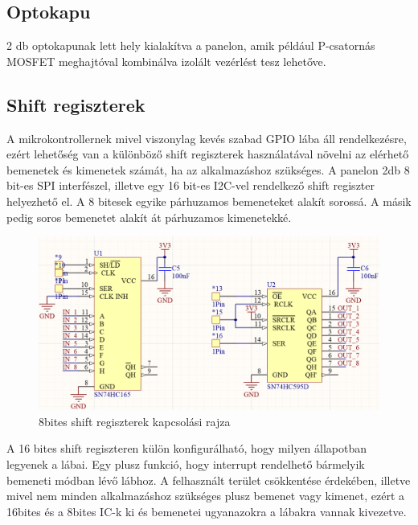 \subsection{Optokapu}
2 db optokapunak lett hely kialakítva a panelon, amik például P-csatornás MOSFET meghajtóval kombinálva izolált vezérlést tesz lehetőve.


\subsection{Shift regiszterek}
A mikrokontrollernek mivel viszonylag kevés szabad GPIO lába áll rendelkezésre, ezért lehetőség van a különböző shift regiszterek használatával növelni az elérhető bemenetek és kimenetek számát, ha az alkalmazáshoz szükséges. A panelon 2db 8 bit-es SPI interfészel, illetve egy 16 bit-es I2C-vel rendelkező shift regiszter helyezhető el. A 8 bitesek egyike párhuzamos bemeneteket alakít sorossá. A másik pedig soros bemenetet alakít át párhuzamos kimenetekké. 
\begin{figure}[!h]
    \centering
    \includegraphics[width=150mm, keepaspectratio]{figures/8bit_shift_registers.png}
    \caption{8bites shift regiszterek kapcsolási rajza}
    \label{fig:TeXstudio}
\end{figure}
A 16 bites shift regiszteren külön konfigurálható, hogy milyen állapotban legyenek a lábai. Egy plusz funkció, hogy interrupt rendelhető bármelyik bemeneti módban lévő lábhoz. A felhasznált terület csökkentése érdekében, illetve mivel nem minden alkalmazáshoz szükséges plusz bemenet vagy kimenet, ezért a 16bites és a 8bites IC-k ki és bemenetei ugyanazokra a lábakra vannak kivezetve.
